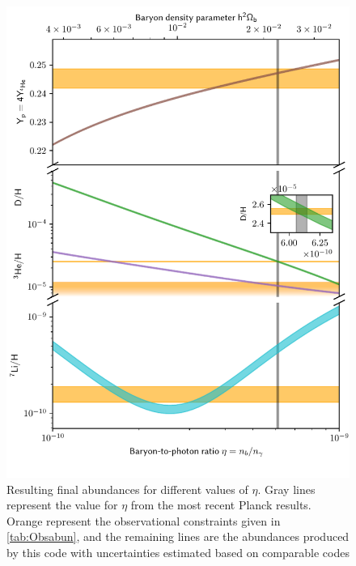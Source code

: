 \begin{figure}[ht]
    \includegraphics[width=5.1in]{figures/etaplot.pdf}
    \caption{Resulting final abundances for different values of $\eta$. Gray lines represent the value for $\eta$ from the most recent Planck results\cite{Planck}. Orange represent the observational constraints given in \cref{tab:Obsabun}, and the remaining lines are the abundances produced by this code with uncertainties estimated based on comparable codes}
    \label{fig:etaplot}
\end{figure}
